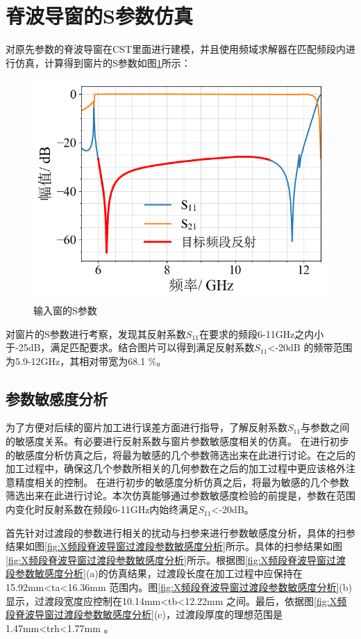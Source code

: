 \documentclass[master]{thesis-uestc}
\begin{document}
\section{脊波导窗的S参数仿真}
对原先参数的脊波导窗在CST里面进行建模，并且使用频域求解器在匹配频段内进行仿真，计算得到窗片的S参数如图\ref{fig:输入窗的S参数}所示：

\begin{figure}[!htb]
    \centering
    \includegraphics[width=0.6\linewidth]{pic/chapter3/脊波导窗S参数.png}
    \caption{输入窗的S参数}
    \label{fig:输入窗的S参数}
\end{figure}
对窗片的S参数进行考察，发现其反射系数$S_{11}$在要求的频段6-11GHz之内小于-25dB，满足匹配要求。结合图片可以得到满足反射系数$S_{11}$<-20dB 的频带范围为5.9-12GHz，其相对带宽为68.1 \%。

\subsection{参数敏感度分析}\label{subsec:脊波导窗的参数敏感度分析}
为了方便对后续的窗片加工进行误差方面进行指导，了解反射系数\(S_{11}\)与参数之间的敏感度关系。有必要进行反射系数与窗片参数敏感度相关的仿真。
在进行初步的敏感度分析仿真之后，将最为敏感的几个参数筛选出来在此进行讨论。在之后的加工过程中，确保这几个参数所相关的几何参数在之后的加工过程中更应该格外注意精度相关的控制。
在进行初步的敏感度分析仿真之后，将最为敏感的几个参数筛选出来在此进行讨论。本次仿真能够通过参数敏感度检验的前提是，参数在范围内变化时反射系数在频段6-11GHz内始终满足\(S_{11}\)<-20dB。

首先针对过渡段的参数进行相关的扰动与扫参来进行参数敏感度分析，具体的扫参结果如图\ref{fig:X频段脊波导窗过渡段参数敏感度分析}所示。具体的扫参结果如图\ref{fig:X频段脊波导窗过渡段参数敏感度分析}所示。根据图\ref{fig:X频段脊波导窗过渡段参数敏感度分析}(a)的仿真结果，过渡段长度在加工过程中应保持在15.92mm<ta<16.36mm 范围内。图\ref{fig:X频段脊波导窗过渡段参数敏感度分析}(b)显示，过渡段宽度应控制在10.14mm<tb<12.22mm 之间。最后，依据图\ref{fig:X频段脊波导窗过渡段参数敏感度分析}(c)，过渡段厚度的理想范围是1.47mm<trh<1.77mm 。
\end{document}
